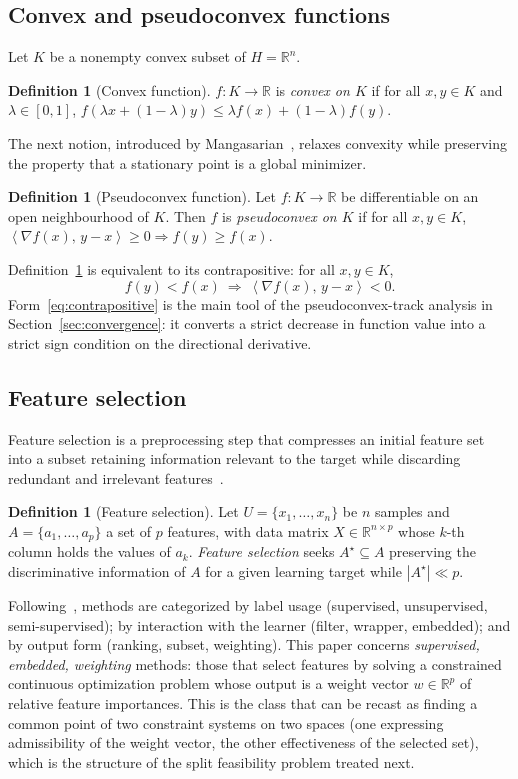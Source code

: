 \documentclass[]{interact}
\theoremstyle{plain}
\theoremstyle{definition}
\newtheorem{definition}[theorem]{Definition}
\theoremstyle{remark}
\newcommand{\R}{\mathbb{R}}
\newcommand{\abs}[1]{\left\lvert #1 \right\rvert}
\newcommand{\inner}[2]{\left\langle #1,\, #2 \right\rangle}
\begin{document}
\subsection{Convex and pseudoconvex functions}\label{ssec:convex}
Let $K$ be a nonempty convex subset of $H=\R^n$.
\begin{definition}[Convex function]\label{def:convex}
$f:K\to\R$ is \emph{convex on $K$} if for all $x,y\in K$ and $\lambda\in[0,1]$,
$f(\lambda x+(1-\lambda)y)\le \lambda f(x)+(1-\lambda)f(y)$.
\end{definition}
The next notion, introduced by Mangasarian~\citep{mangasarian1965}, relaxes convexity
while preserving the property that a stationary point is a global minimizer.
\begin{definition}[Pseudoconvex function]\label{def:pseudoconvex}
Let $f:K\to\R$ be differentiable on an open neighbourhood of $K$. Then $f$ is
\emph{pseudoconvex on $K$} if for all $x,y\in K$,
$\inner{\nabla f(x)}{y-x}\ge 0\Rightarrow f(y)\ge f(x)$.
\end{definition}
Definition~\ref{def:pseudoconvex} is equivalent to its contrapositive: for all
$x,y\in K$,
\begin{equation}\label{eq:contrapositive}
f(y)<f(x)\ \Longrightarrow\ \inner{\nabla f(x)}{y-x}<0 .
\end{equation}
Form~\eqref{eq:contrapositive} is the main tool of the pseudoconvex-track analysis in
Section~\ref{sec:convergence}: it converts a strict decrease in function value into a
strict sign condition on the directional derivative.
\subsection{Feature selection}\label{ssec:fs-prelim}
Feature selection is a preprocessing step that compresses an initial feature set into
a subset retaining information relevant to the target while discarding redundant and
irrelevant features~\citep{guyon2003,theng2024fs}.
\begin{definition}[Feature selection]\label{def:fs}
Let $U=\{x_1,\dots,x_n\}$ be $n$ samples and $A=\{a_1,\dots,a_p\}$ a set of $p$
features, with data matrix $X\in\R^{n\times p}$ whose $k$-th column holds the values of
$a_k$. \emph{Feature selection} seeks $A^\star\subseteq A$ preserving the discriminative
information of $A$ for a given learning target while $\abs{A^\star}\ll p$.
\end{definition}
Following~\citep{theng2024fs}, methods are categorized by label usage (supervised,
unsupervised, semi-supervised); by interaction with the learner (filter, wrapper,
embedded); and by output form (ranking, subset, weighting). This paper concerns
\emph{supervised, embedded, weighting} methods: those that select features by solving
a constrained continuous optimization problem whose output is a weight vector
$w\in\R^p$ of relative feature importances. This is the class that can be
recast as finding a common point of two constraint systems on two spaces (one
expressing admissibility of the weight vector, the other effectiveness of the selected
set), which is the structure of the split feasibility problem treated next.
\end{document}
